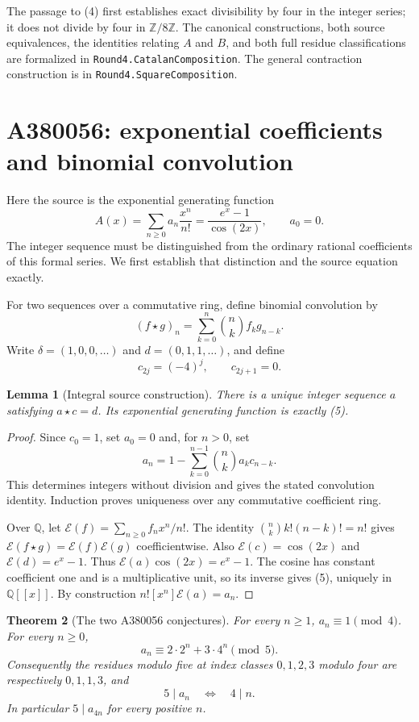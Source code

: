 \documentclass[11pt,a4paper]{article}
\newtheorem{theorem}{Theorem}[section]
\newtheorem{lemma}[theorem]{Lemma}
\theoremstyle{remark}
\newcommand{\Z}{\mathbb Z}
\newcommand{\Q}{\mathbb Q}
\newcommand{\E}{\mathcal E}
\begin{document}
The passage to (4) first establishes exact divisibility by four in the
integer series; it does not divide by four in $\Z/8\Z$. The canonical
constructions, both source equivalences, the identities relating $A$ and
$B$, and both full residue classifications are formalized in
\texttt{Round4.CatalanComposition}. The general contraction construction
is in \texttt{Round4.SquareComposition}.

\section{A380056: exponential coefficients and binomial convolution}

Here the source is the exponential generating function
\cite{oeis056}
\[
 A(x)=\sum_{n\ge0}a_n\frac{x^n}{n!}
     =\frac{e^x-1}{\cos(2x)},\qquad a_0=0. \tag{5}
\]
The integer sequence must be distinguished from the ordinary rational
coefficients of this formal series. We first establish that distinction
and the source equation exactly.

For two sequences over a commutative ring, define binomial convolution by
\[
 (f\star g)_n=\sum_{k=0}^n\binom nk f_k g_{n-k}.
\]
Write $\delta=(1,0,0,\ldots)$ and $d=(0,1,1,\ldots)$, and define
\[
 c_{2j}=(-4)^j,\qquad c_{2j+1}=0.
\]

\begin{lemma}[Integral source construction]\label{lem:egfsource}
There is a unique integer sequence $a$ satisfying $a\star c=d$. Its
exponential generating function is exactly (5).
\end{lemma}

\begin{proof}
Since $c_0=1$, set $a_0=0$ and, for $n>0$, set
\[
 a_n=1-\sum_{k=0}^{n-1}\binom nk a_k c_{n-k}.
\]
This determines integers without division and gives the stated
convolution identity. Induction proves uniqueness over any commutative
coefficient ring.

Over $\Q$, let $\E(f)=\sum_{n\ge0}f_nx^n/n!$. The identity
$\binom nk k!(n-k)!=n!$ gives
$\E(f\star g)=\E(f)\E(g)$ coefficientwise. Also
$\E(c)=\cos(2x)$ and $\E(d)=e^x-1$. Thus
$\E(a)\cos(2x)=e^x-1$. The cosine has constant coefficient one and is
a multiplicative unit, so its inverse gives (5), uniquely in $\Q[[x]]$.
By construction $n![x^n]\E(a)=a_n$.
\end{proof}

\begin{theorem}[The two A380056 conjectures]\label{thm:egf}
For every $n\ge1$, $a_n\equiv1\pmod4$. For every $n\ge0$,
\[
 a_n\equiv2\cdot2^n+3\cdot4^n\pmod5. \tag{6}
\]
Consequently the residues modulo five at index classes $0,1,2,3$ modulo
four are respectively $0,1,1,3$, and
\[
 5\mid a_n\quad\Longleftrightarrow\quad4\mid n.
\]
In particular $5\mid a_{4n}$ for every positive $n$.
\end{theorem}
\end{document}
